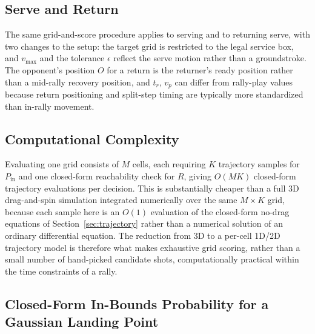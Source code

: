   \subsection{Serve and Return}\label{sec:serve}

  The same grid-and-score procedure applies to serving and to returning serve,
  with two changes to the setup: the target grid is restricted to the legal
  service box, and $v_{\max}$ and the tolerance $\epsilon$ reflect the serve
  motion rather than a groundstroke. The opponent's position $O$ for a return
  is the returner's ready position rather than a mid-rally recovery position,
  and $t_r$, $v_p$ can differ from rally-play values because return positioning
  and split-step timing are typically more standardized than in-rally movement.

  \subsection{Computational Complexity}\label{sec:complexity}

  Evaluating one grid consists of $M$ cells, each requiring $K$ trajectory
  samples for $P_{\mathrm{in}}$ and one closed-form reachability check for $R$,
  giving $O(MK)$ closed-form trajectory evaluations per decision. This is
  substantially cheaper than a full 3D drag-and-spin simulation integrated
  numerically over the same $M \times K$ grid, because each sample here is an
  $O(1)$ evaluation of the closed-form no-drag equations of
  Section~\ref{sec:trajectory} rather than a numerical solution of an ordinary
  differential equation. The reduction from 3D to a per-cell 1D/2D trajectory
  model is therefore what makes exhaustive grid scoring, rather than a small
  number of hand-picked candidate shots, computationally practical within the
  time constraints of a rally.

  \subsection{Closed-Form In-Bounds Probability for a Gaussian Landing
    Point}\label{sec:pin}


